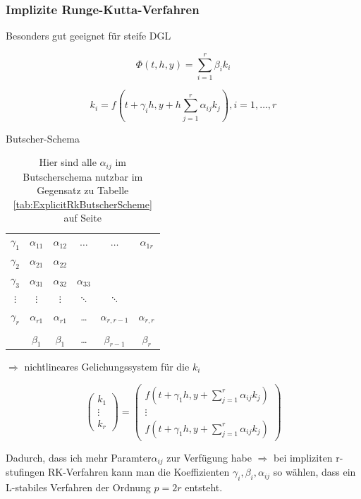 \documentclass[10pt,a4paper]{article}
\begin{document}
\subsubsection{Implizite Runge-Kutta-Verfahren}

Besonders gut geeignet für steife DGL

$$\Phi(t,h,y) = \sum_{i=1}^{r} \beta_i k_i $$

$$k_i = f(t+\gamma_i h,y +h \sum_{j=1}^{r} \alpha_{ij} k_j), i=1,\ldots,r$$

Butscher-Schema

\begin{table}[H]
\centering
\begin{tabular}{c| c c c c c}
$\gamma_1$ & $\alpha_{11}$ & $\alpha_{12}$ & $\ldots$ & $\ldots$ & $\alpha_{1r}$\\
$\gamma_2$ & $\alpha_{21}$ & $\alpha_{22}$ \\
$\gamma_3$ & $\alpha_{31}$ & $\alpha_{32}$ & $\alpha_{33}$\\
$\vdots$ & $\vdots$ & $\vdots$ & $\ddots$ & $\ddots$ \\
$\gamma_r$ & $\alpha_{r1}$ & $\alpha_{r1}$ & \ldots & $\alpha_{r,r-1}$ & $\alpha_{r,r}$ \\
\hline \\
 & $\beta_1$ & $\beta_1$ & \ldots & $\beta_{r-1}$ & $\beta_r$
\end{tabular}
\caption{Hier sind alle $\alpha_{ij}$ im Butscherschema nutzbar im Gegensatz zu Tabelle \ref{tab:ExplicitRkButscherScheme} auf Seite \pageref{tab:ExplicitRkButscherScheme}}
\end{table}




$\Rightarrow$ nichtlineares Gelichungssystem für die $k_i$

$$
\begin{pmatrix}
k_1 \\ \vdots \\ k_r
\end{pmatrix} = \begin{pmatrix}
f(t+\gamma_1 h, y + \sum_{j=1}^{r} \alpha_{ij} k_j) \\ \vdots \\ f(t+\gamma_1 h, y + \sum_{j=1}^{r} \alpha_{ij} k_j)
\end{pmatrix}
$$

Dadurch, dass ich mehr Paramter$\alpha_{ij}$ zur Verfügung habe $\Rightarrow$ bei impliziten r-stufingen RK-Verfahren kann man die Koeffizienten $\gamma_i, \beta_i, \alpha_{ij}$ so wählen, dass ein L-stabiles Verfahren der Ordnung $p=2r$ entsteht.
\end{document}
